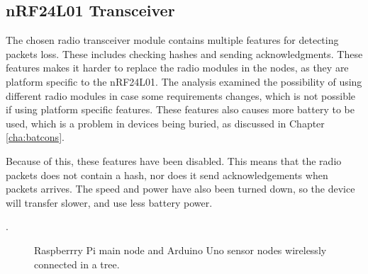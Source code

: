 \subsection{nRF24L01 Transceiver}
The chosen radio transceiver module contains multiple features for detecting packets loss. These includes checking hashes and sending acknowledgments\cite{nf24datasheet}.
These features makes it harder to replace the radio modules in the nodes, as they are platform specific to the nRF24L01. The analysis examined the possibility of using different radio modules in case some requirements changes, which is not possible if using platform specific features. These features also causes more battery to be used, which is a problem in devices being buried, as discussed in Chapter \ref{cha:batcons}.

Because of this, these features have been disabled. This means that the radio packets does not contain a hash, nor does it send acknowledgements when packets arrives. The speed and power have also been turned down, so the device will transfer slower, and use less battery power.

.

\begin{figure}[!h]
	\centering
	\caption{Raspberrry Pi main node and Arduino Uno sensor nodes wirelessly connected in a tree.}
	\label{fig:raspbuinoTree}
\end{figure}
